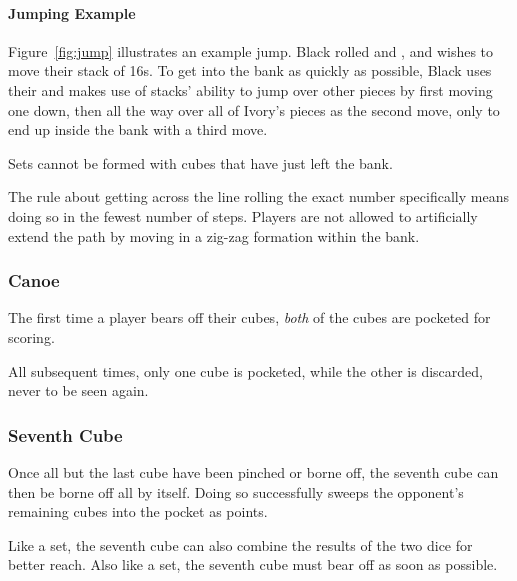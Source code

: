 \paragraph{Jumping Example}
Figure~\ref{fig:jump} illustrates an example jump.
Black rolled  and , and wishes to move their stack of 16s.
To get into the bank as quickly as possible, Black uses their  and makes use of stacks' ability to jump over other pieces by first moving one down, then all the way over all of Ivory's pieces as the second move, only to end up inside the bank with a third move.

\note Sets cannot be formed with cubes that have just left the bank.

\note The rule about getting across the line rolling the exact number specifically means doing so in the fewest number of steps. Players are not allowed to artificially extend the path by moving in a zig-zag formation within the bank.

\subsubsection{Canoe}
The first time a player bears off their cubes, \textit{both} of the cubes are pocketed for scoring.

All subsequent times, only one cube is pocketed, while the other is discarded, never to be seen again.

\subsubsection{Seventh Cube}
Once all but the last cube have been pinched or borne off, the seventh cube can then be borne off all by itself.
Doing so successfully sweeps the opponent's remaining cubes into the pocket as points.

Like a set, the seventh cube can also combine the results of the two dice for better reach.
Also like a set, the seventh cube must bear off as soon as possible.